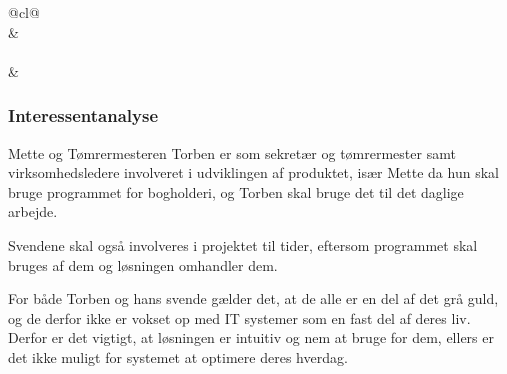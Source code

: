 \begin{table}[h]
\begin{tabular}{@{}cl@{}}
                                                                                                                                                                                                                                                            \\ \midrule
{}                                                                                                &                                   \\ \midrule
{}                                                                                                                                                                               \\ \midrule
{} &  \\ \bottomrule
\end{tabular}
\end{table}

\subsubsection{Interessentanalyse}
Mette og Tømrermesteren Torben er som sekretær og tømrermester samt virksomhedsledere involveret i udviklingen af produktet, især Mette da hun skal bruge programmet for bogholderi, og Torben skal bruge det til det daglige arbejde.

Svendene skal også involveres i projektet til tider, eftersom programmet skal bruges af dem og løsningen omhandler dem.

For både Torben og hans svende gælder det, at de alle er en del af det grå guld, og de derfor ikke er vokset op med IT systemer som en fast del af deres liv.
Derfor er det vigtigt, at løsningen er intuitiv og nem at bruge for dem, ellers er det ikke muligt for systemet at optimere deres hverdag.
